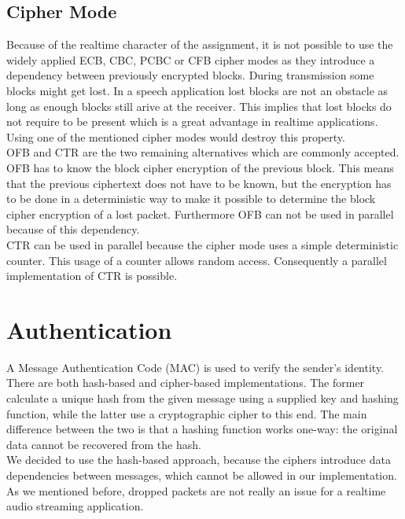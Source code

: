 \documentclass[a4paper]{article}
\begin{document}
\subsection{Cipher Mode}
\label{par:cipher_mode}
Because of the realtime character of the assignment, it is not possible to use the widely applied ECB, CBC, PCBC or CFB cipher modes as they introduce a dependency between previously encrypted blocks. During transmission some blocks might get lost. In a speech application lost blocks are not an obstacle as long as enough blocks still arive at the receiver. This implies that lost blocks do not require to be present which is a great advantage in realtime applications. Using one of the mentioned cipher modes would destroy this property.\\

OFB and CTR are the two remaining alternatives which are commonly accepted. OFB has to know the block cipher encryption of the previous block. This means that the previous ciphertext does not have to be known, but the encryption has to be done in a deterministic way to make it possible to determine the block cipher encryption of a lost packet. Furthermore OFB can not be used in parallel because of this dependency.\\

CTR can be used in parallel because the cipher mode uses a simple deterministic counter. This usage of a counter allows random access. Consequently a parallel implementation of CTR is possible.

\section{Authentication}

A Message Authentication Code (MAC) is used to verify the sender's identity. There are both hash-based and cipher-based implementations. The former calculate a unique hash from the given message using a supplied key and hashing function, while the latter use a cryptographic cipher to this end. The main difference between the two is that a hashing function works one-way: the original data cannot be recovered from the hash.\\

We decided to use the hash-based approach, because the ciphers introduce data dependencies between messages, which cannot be allowed in our implementation. As we mentioned before, dropped packets are not really an issue for a realtime audio streaming application.
\end{document}
